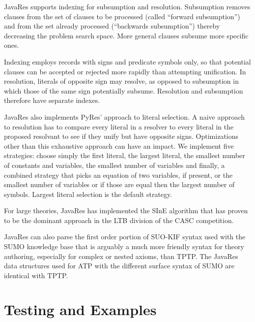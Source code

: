 \documentclass{llncs}
\begin{document}
JavaRes supports indexing for subsumption and resolution.  Subsumption
removes clauses from the set of clauses to be processed (called
``forward subsumption'') and from the set already processed (``backwards
subsumption'') thereby decreasing the problem search space.  More
general clauses subsume more specific ones.

Indexing employs
records with signs and predicate symbols only, so that potential clauses can
be accepted or rejected more rapidly than attempting unification.  In resolution, literals of opposite sign may resolve,
as opposed to subsumption in which those of the same sign potentially subsume.
Resolution and subsumption therefore have separate indexes.

JavaRes also implements PyRes' approach to literal selection.  A naive
approach to resolution has to compare every literal in a resolver to
every literal in the proposed resolvant to see if they unify but have
opposite signs.  Optimizations other than this exhaustive approach can
have an impact.  We implement five strategies: choose simply the first
literal, the largest literal, the smallest number of constants and
variables, the smallest number of variables and finally, a combined
strategy that picks an equation of two variables, if present, or the
smallest number of variables or if those are equal then the largest
number of symbols.  Largest literal selection is the default strategy.

For large theories, JavaRes has implemented the SInE
algorithm\cite{HV:CADE-2011} that has proven to be the dominant approach in the
LTB division of the CASC competition.

JavaRes can also parse the first order portion of SUO-KIF syntax used
with the SUMO knowledge base that is arguably a much more friendly
syntax for theory authoring, especially for complex or nested axioms,
than TPTP.  The JavaRes data structures used for ATP with the different surface
syntax of SUMO are identical with TPTP.


\section{Testing and Examples}
\end{document}
